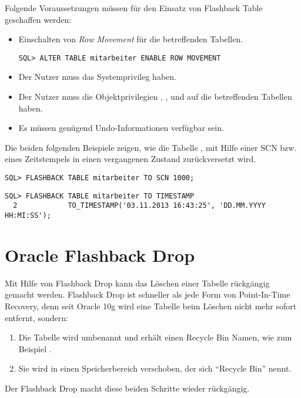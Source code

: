       Folgende Voraussetzungen müssen für den Einsatz von Flashback Table geschaffen werden:
\clearpage
      \begin{itemize}
        \item Einschalten von \textit{Row Movement} für die betreffenden Tabellen.
        \begin{lstlisting}[caption={Einschalten von Row Movement},label=admin1714,language=oracle_sql]
SQL> ALTER TABLE mitarbeiter ENABLE ROW MOVEMENT
        \end{lstlisting}
        \item Der Nutzer muss das Systemprivileg  haben.
        \item Der Nutzer muss die Objektprivilegien , ,  und  auf die betreffenden Tabellen haben.
        \item Es müssen genügend Undo-Informationen verfügbar sein.
      \end{itemize}
      Die beiden folgenden Beispiele zeigen, wie die Tabelle , mit Hilfe einer SCN bzw. eines Zeitstempels in einen vergangenen Zustand zurückversetzt wird.
      \begin{lstlisting}[caption={Flashback Table mit SCN},label=admin1715,language=oracle_sql]
SQL> FLASHBACK TABLE mitarbeiter TO SCN 1000;
      \end{lstlisting}
      \begin{lstlisting}[caption={Flashback Table mit Zeitstempel},label=admin1716,language=oracle_sql]
SQL> FLASHBACK TABLE mitarbeiter TO TIMESTAMP
  2            TO_TIMESTAMP('03.11.2013 16:43:25', 'DD.MM.YYYY HH:MI:SS');
      \end{lstlisting}
    \section{Oracle Flashback Drop}
      Mit Hilfe von Flashback Drop kann das Löschen einer Tabelle rückgängig gemacht werden. Flashback Drop ist schneller als jede Form von Point-In-Time Recovery, denn seit Oracle 10g wird eine Tabelle beim Löschen nicht mehr sofort entfernt, sondern:
      \begin{enumerate}
        \item Die Tabelle wird umbenannt und erhält einen Recycle Bin Namen, wie zum Beispiel  .
        \item Sie wird in einen Speicherbereich verschoben, der sich \enquote{Recycle Bin} nennt.
      \end{enumerate}
      Der Flashback Drop macht diese beiden Schritte wieder rückgängig.
